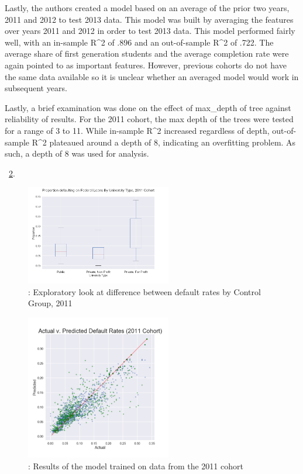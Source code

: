 \documentclass[10pt,twocolumn]{article}
\begin{document}
Lastly, the authors created a model based on an average of the prior two years, 2011
and 2012 to test 2013 data. This model was built by averaging the features over years
2011 and 2012 in order to test 2013 data. This model performed fairly well, with
an in-sample R^2 of .896 and an out-of-sample R^2 of .722. The average share of
first generation students and the average completion rate were again pointed to
as important features. However, previous cohorts do not have the same data available
so it is unclear whether an averaged model would work in subsequent years.

Lastly, a brief examination was done on the effect of max_depth of tree against
reliability of results. For the 2011 cohort, the max depth of the trees were tested
for a range of 3 to 11. While in-sample R^2 increased regardless of depth, out-of-sample
R^2 plateaued around a depth of 8, indicating an overfitting problem. As such, a depth of 8
was used for analysis.




    ~\ref{results2011}.

\begin{figure}[!t]
  \begin{center}
    \includegraphics[width=2.5in]{fedloans.png}
  \end{center}

  \caption{: Exploratory look at difference between default rates by Control Group, 2011}
  \label{boxplot}
\end{figure}

\begin{figure}[!t]
  \begin{center}
    \includegraphics[width=2.5in]{results2011.png}
  \end{center}

  \caption{: Results of the model trained on data from the 2011 cohort}
  \label{results2011}
\end{figure}
\end{document}
